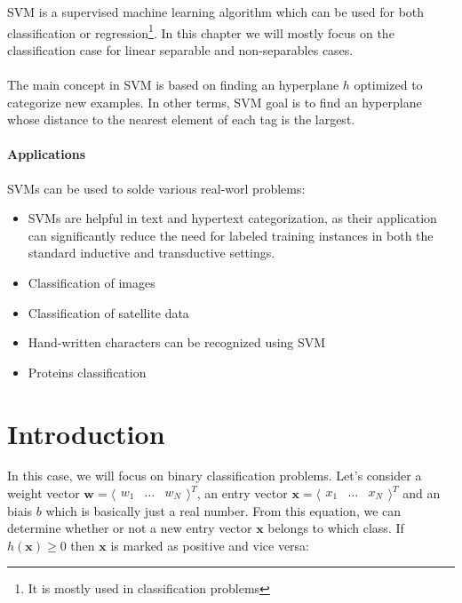 \gls{SVM} is a supervised machine learning algorithm which can be used for both classification or regression\footnote{It is mostly used in classification problems}. In this chapter we will mostly focus on the classification case for linear separable and non-separables cases.

\paragraph{}
The main concept in \gls{SVM} is based on finding an hyperplane $h$ optimized to categorize new examples. In other terms, \gls{SVM} goal is to find an hyperplane whose distance to the nearest element of each tag is the largest.

\paragraph{Applications}
\gls{SVM}s can be used to solde various real-worl problems:
\begin{itemize}
	\item \gls{SVM}s are helpful in text and hypertext categorization, as their application can significantly reduce the need for labeled training instances in both the standard inductive and transductive settings.
	\item Classification of images
	\item Classification of satellite data
	\item Hand-written characters can be recognized using SVM
	\item Proteins classification
\end{itemize}

\section{Introduction}

In this case, we will focus on binary classification problems. Let's consider a weight vector $\mathbf w = \langle \begin{matrix} w_1 & \dots & w_N \end{matrix} \rangle^T$, an entry vector $\mathbf x = \langle \begin{matrix} x_1 & \dots & x_N \end{matrix} \rangle^T$ and an biais $b$ which is basically just a real number.
From this equation, we can determine whether or not a new entry vector $\mathbf x$ belongs to which class.
If $h(\mathbf x) \geq 0$ then $\mathbf x$ is marked as positive and vice versa:


